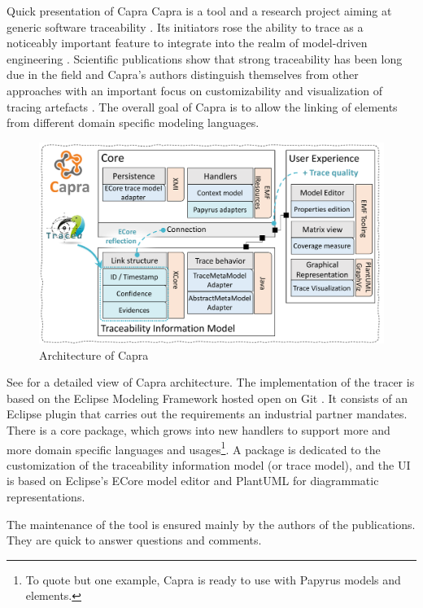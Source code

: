 \begin{descriptioncompact}
    \item[Quick presentation of Capra] Capra is a tool and a research project aiming at generic software traceability \cite{heisig2019-generic-traceability-metamodel-end-to-end-capra,maro2016_maintenance_factors_and_guidelines}. Its initiators rose the ability to trace as a noticeably important feature to integrate into the realm of model-driven engineering \cite{hotlmann2020-MB-traceability-terminology}. Scientific publications show that strong traceability has been long due in the field and Capra's authors distinguish themselves from other approaches with an important focus on customizability and visualization of tracing artefacts \cite{clelandhuang2007bestPracticeForAutomatedTraceability,mader2010-visual-tracability-modeling-language}. The overall goal of Capra is to allow the linking of elements from different domain specific modeling languages.

    \begin{figure}[h]  
    	\centering
    	\includegraphics[width=.85\linewidth]{images/capra-architecture}
    	\caption{Architecture of Capra}
    	\label{fig:capraarchitecture}
    \end{figure}
    
    See  for a detailed view of Capra architecture. The implementation of the tracer is based on the Eclipse Modeling Framework \cite{EMF} hosted open on Git \cite{Capra_Repo}. It consists of an Eclipse plugin that carries out the requirements an industrial partner mandates.  There is a core package, which grows into new handlers to support more and more domain specific languages and usages\footnote{To quote but one example, Capra is ready to use with Papyrus models and elements.}. A package is dedicated to the customization of the traceability information model (or trace model), and the UI is based on Eclipse's ECore model editor and PlantUML for diagrammatic representations.
     
    The maintenance of the tool is ensured mainly by the authors of the publications. They are quick to answer questions and comments.
    
    

\end{descriptioncompact}


